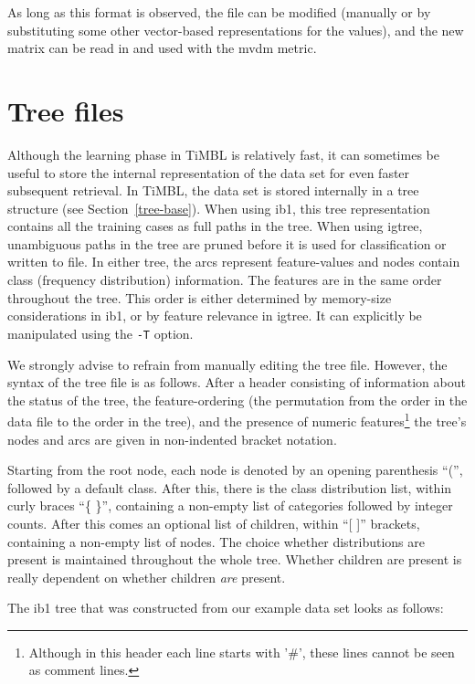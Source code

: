 \documentclass{report}
\begin{document}
As long as this format is observed, the file can be modified (manually
or by substituting some other vector-based representations for the
values), and the new matrix can be read in and used with the {\sc
mvdm} metric.

\section{Tree files}
\label{treeformat}

Although the learning phase in TiMBL is relatively fast, it can
sometimes be useful to store the internal representation of the data
set for even faster subsequent retrieval. In TiMBL, the data set is
stored internally in a tree structure (see
Section~\ref{tree-base}). When using {\sc ib1}, this tree representation
contains all the training cases as full paths in the tree. When using
{\sc igtree}, unambiguous paths in the tree are pruned before it is
used for classification or written to file. In either tree, the arcs
represent feature-values and nodes contain class (frequency
distribution) information. The features are in the same order
throughout the tree. This order is either determined by memory-size
considerations in {\sc ib1}, or by feature relevance in {\sc igtree}. It can
explicitly be manipulated using the {\tt -T} option.

We strongly advise to refrain from manually editing the tree
file. However, the syntax of the tree file is as follows. After a
header consisting of information about the status of the tree, the
feature-ordering (the permutation from the order in the data file to
the order in the tree), and the presence of numeric
features\footnote{Although in this header each line starts with '\#',
these lines cannot be seen as comment lines.} the tree's nodes and
arcs are given in non-indented bracket notation.

Starting from the root node, each node is denoted by an opening
parenthesis ``('', followed by a default class. After this, there is
the class distribution list, within curly braces ``\{ \}'', containing
a non-empty list of categories followed by integer counts. After this
comes an optional list of children, within ``[ ]'' brackets,
containing a non-empty list of nodes. The choice whether distributions
are present is maintained throughout the whole tree. Whether children
are present is really dependent on whether children {\em are} present.

The {\sc ib1} tree that was constructed from our example data set looks as
follows:
\end{document}
